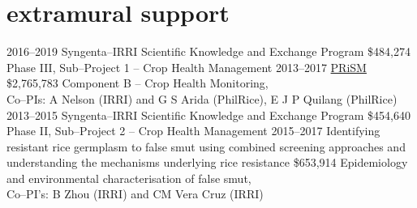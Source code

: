 \documentclass[]{friggeri-cv}
\begin{document}
\section*{extramural support}
  \begin{entrylist}
  \entry
	{2016--2019}
	{Syngenta--IRRI Scientific Knowledge and Exchange Program}
	{\$484,274}
	{Phase III, Sub--Project 1 -- Crop Health Management}
  \entry
	{2013--2017}
	{\href{http://philippinericeinfo.ph/}{PRiSM }}
	{\$2,765,783}
	{Component B -- Crop Health Monitoring,\\Co--PIs: A Nelson (IRRI) and G S Arida (PhilRice), E J P Quilang (PhilRice)}
  \entry
	{2013--2015}
	{Syngenta--IRRI Scientific Knowledge and Exchange Program}
	{\$454,640}
	{Phase II, Sub--Project 2 -- Crop Health Management}
  \entry
    {2015--2017}
    {Identifying resistant rice germplasm to false smut using combined screening approaches and understanding the mechanisms underlying rice resistance}
    {\$653,914}
    {Epidemiology and environmental characterisation of false smut,\\Co--PI's: B Zhou (IRRI) and CM Vera Cruz (IRRI)}
  \end{entrylist}


\end{document}
